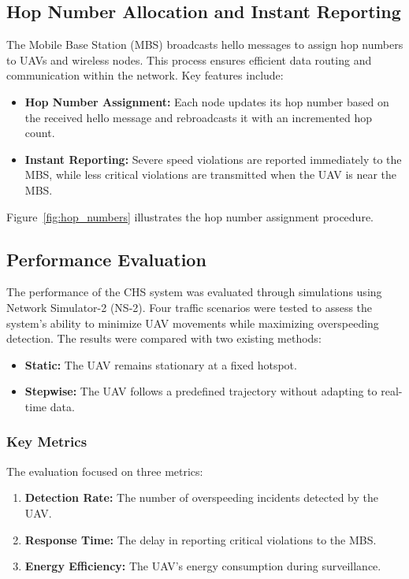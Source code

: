 \vspace{\baselineskip} %

\subsection{Hop Number Allocation and Instant Reporting}
The Mobile Base Station (MBS) broadcasts hello messages to assign hop numbers to UAVs and wireless nodes. This process ensures efficient data routing and communication within the network. Key features include:
\begin{itemize}
    \item \textbf{Hop Number Assignment:} Each node updates its hop number based on the received hello message and rebroadcasts it with an incremented hop count.
    \item \textbf{Instant Reporting:} Severe speed violations are reported immediately to the MBS, while less critical violations are transmitted when the UAV is near the MBS.
\end{itemize}

Figure~\ref{fig:hop_numbers} illustrates the hop number assignment procedure.

\vspace{\baselineskip} %

\subsection{Performance Evaluation}
The performance of the CHS system was evaluated through simulations using Network Simulator-2 (NS-2). Four traffic scenarios were tested to assess the system’s ability to minimize UAV movements while maximizing overspeeding detection. The results were compared with two existing methods:
\begin{itemize}
    \item \textbf{Static:} The UAV remains stationary at a fixed hotspot.
    \item \textbf{Stepwise:} The UAV follows a predefined trajectory without adapting to real-time data.
\end{itemize}

\subsubsection{Key Metrics}
The evaluation focused on three metrics:
\begin{enumerate}
    \item \textbf{Detection Rate:} The number of overspeeding incidents detected by the UAV.
    \item \textbf{Response Time:} The delay in reporting critical violations to the MBS.
    \item \textbf{Energy Efficiency:} The UAV’s energy consumption during surveillance.
\end{enumerate}

